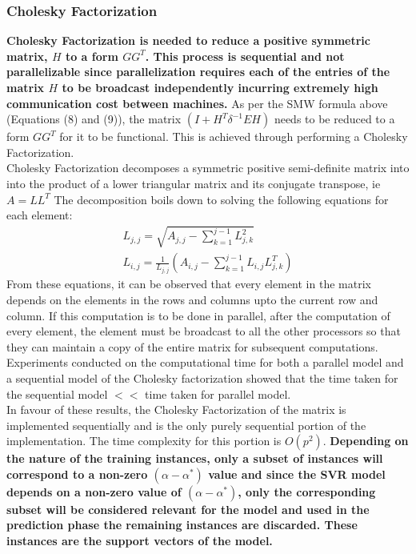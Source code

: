 \documentclass[12pt]{article}
\begin{document}
\subsubsection{Cholesky Factorization}
\label{Cholesky Factorization} 
  {\bf Cholesky Factorization is needed to reduce a positive symmetric matrix, $H$ to a form $GG^T$. This process is sequential and not parallelizable since parallelization requires each of the entries of the matrix $H$ to be broadcast independently incurring extremely high communication cost between machines.}
 \newline\newline
As per the SMW formula above (Equations (8) and (9)), the matrix $(I + H^T \delta^{-1}EH)$ needs to be reduced to a form $GG^T$ for it to be functional. This is achieved through performing a Cholesky Factorization.\\
Cholesky Factorization decomposes a symmetric positive semi-definite matrix into into the product of a lower triangular matrix and its conjugate transpose, ie $A = LL^T$
\newline
The decomposition boils down to solving the following equations for each element:
\begin{gather*}
L_{j, j} = \sqrt{A_{j, j} -  \sum_{k=1}^{j-1}{L_{j, k}^2}}\\
L_{i, j} = \frac{1}{L_{j, j}}(A_{i, j} -  \sum_{k=1}^{j-1}{L_{i,j}L_{j, k}^T})
\end{gather*}
From these equations, it can be observed that every element in the matrix depends on the elements in the rows and columns upto the current row and column.  If this computation is to be done in parallel, after the computation of every element, the element must be broadcast to all the other processors so that they can maintain a copy of the entire matrix for subsequent computations. Experiments conducted on the computational time for both a parallel model and a sequential model of the Cholesky factorization showed that the time taken for the sequential model  $ << $ time taken for parallel model.\\
In favour of these results, the Cholesky Factorization of the matrix is implemented sequentially  and is the only purely sequential portion of the implementation. The time complexity for this portion is $O(p^2)$.
 \newline\newline
 {\bf Depending on the nature of the training instances, only a subset of instances will correspond to a non-zero $(\alpha - \alpha^*)$ value and since the SVR model depends on a non-zero value of $(\alpha - \alpha^*)$, only the corresponding subset will be considered relevant for the model and used in the prediction phase the remaining instances are discarded. These instances are the support vectors of the model.}
\end{document}

